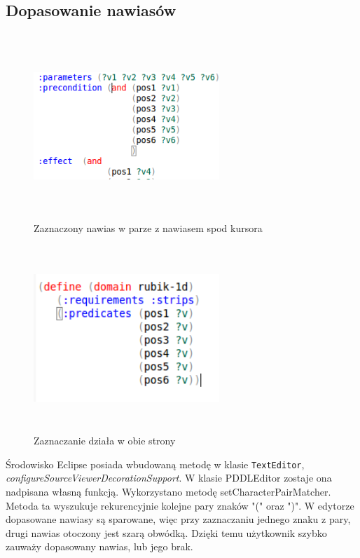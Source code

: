 \subsection{Dopasowanie nawiasów}
\begin{figure}[h]
  \centering
    \includegraphics[width=7cm,height=7cm,keepaspectratio]{img/matched-bracket.png}
    \caption{Zaznaczony nawias w parze z nawiasem spod kursora}
    \label{ana_structure}
\end{figure}
\begin{figure}[h]
  \centering
    \includegraphics[width=7cm,height=7cm,keepaspectratio]{img/matched-bracket-reverse.png}
    \caption{Zaznaczanie działa w obie strony}
    \label{ana_structure}
\end{figure}
Środowisko Eclipse posiada wbudowaną metodę w klasie \texttt{TextEditor}, \emph{configureSourceViewerDecorationSupport}. W klasie PDDLEditor zostaje ona nadpisana własną funkcją. Wykorzystano metodę setCharacterPairMatcher. Metoda ta wyszukuje rekurencyjnie kolejne pary znaków "(" oraz ")".  W edytorze dopasowane nawiasy są sparowane, więc przy zaznaczaniu jednego znaku z pary, drugi nawias otoczony jest szarą obwódką. Dzięki temu użytkownik szybko zauważy dopasowany nawias, lub jego brak.
